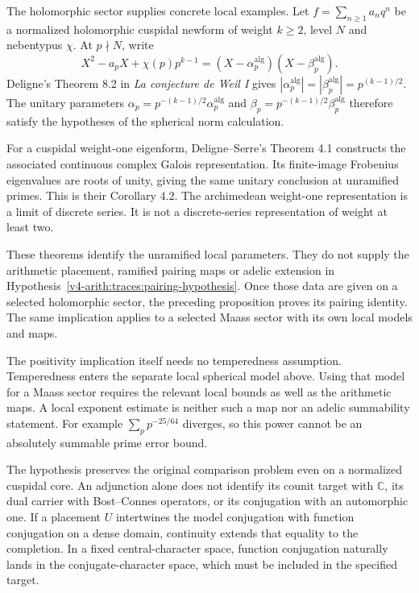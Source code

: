 The holomorphic sector supplies concrete local examples. Let
$f=\sum_{n\geq1}a_nq^n$ be a normalized holomorphic cuspidal newform of
weight $k\geq2$, level $N$ and nebentypus $\chi$. At $p\nmid N$, write
\[
 X^2-a_pX+\chi(p)p^{k-1}
   =(X-\alpha_p^{\mathrm{alg}})(X-\beta_p^{\mathrm{alg}}).
\]
Deligne's Theorem 8.2 in \emph{La conjecture de Weil I} gives
$|\alpha_p^{\mathrm{alg}}|=|\beta_p^{\mathrm{alg}}| =p^{(k-1)/2}$. The
unitary parameters $\alpha_p=p^{-(k-1)/2}\alpha_p^{\mathrm{alg}}$ and
$\beta_p=p^{-(k-1)/2}\beta_p^{\mathrm{alg}}$ therefore satisfy the
hypotheses of the spherical norm calculation.

For a cuspidal weight-one eigenform, Deligne--Serre's Theorem 4.1 constructs
the associated continuous complex Galois representation. Its finite-image
Frobenius eigenvalues are roots of unity, giving the same unitary conclusion
at unramified primes. This is their Corollary 4.2. The archimedean
weight-one representation is a limit of discrete series. It is not a
discrete-series representation of weight at least two.

These theorems identify the unramified local parameters. They do not supply
the arithmetic placement, ramified pairing maps or adelic extension in
Hypothesis~\ref{v4-arith:traces:pairing-hypothesis}. Once those data are
given on a selected holomorphic sector, the preceding proposition proves its
pairing identity. The same implication applies to a selected Maass sector
with its own local models and maps.

The positivity implication itself needs no temperedness assumption.
Temperedness enters the separate local spherical model above. Using that
model for a Maass sector requires the relevant local bounds as well as the
arithmetic maps. A local exponent estimate is neither such a map nor an
adelic summability statement. For example $\sum_p p^{-25/64}$ diverges, so
this power cannot be an absolutely summable prime error bound.

The hypothesis preserves the original comparison problem even on a
normalized cuspidal core. An adjunction alone does not identify its counit
target with $\mathbb C$, its dual carrier with Bost--Connes operators, or
its conjugation with an automorphic one. If a placement $U$ intertwines the
model conjugation with function conjugation on a dense domain, continuity
extends that equality to the completion. In a fixed central-character space,
function conjugation naturally lands in the conjugate-character space, which
must be included in the specified target.

